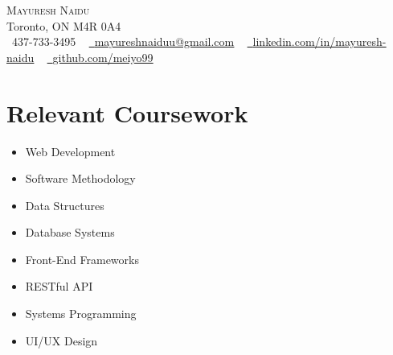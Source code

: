 \documentclass[letterpaper,11pt]{article}
\newcommand{\resumeSubHeadingListStart}{\begin{itemize}[leftmargin=0.0in, label={}]}
\newcommand{\resumeSubHeadingListEnd}{\end{itemize}}
\begin{document}

\begin{center}
    {\Huge \scshape Mayuresh Naidu} \\ \vspace{1pt}
    Toronto, ON M4R 0A4 \\ \vspace{1pt}
    \small \raisebox{-0.1\height}\faPhone\ 437-733-3495 ~ \href{mailto:mayureshnaiduu@gmail.com}{\raisebox{-0.2\height}\faEnvelope\  \underline{mayureshnaiduu@gmail.com}} ~ 
    \href{https://linkedin.com/in/mayuresh-naidu-233802204/}{\raisebox{-0.2\height}\faLinkedin\ \underline{linkedin.com/in/mayuresh-naidu}}  ~
    \href{https://github.com/}{\raisebox{-0.2\height}\faGithub\ \underline{github.com/meiyo99}}
    \vspace{-8pt}
\end{center}


\section{Relevant Coursework}
        \begin{multicols}{4}
            \begin{itemize}[itemsep=-5pt, parsep=3pt]
                \item\small Web Development
                \item Software Methodology
                \item Data Structures
                \item Database Systems
                \item Front-End Frameworks
                \item RESTful API 
                \item Systems Programming
                \item UI/UX Design 
            \end{itemize}
        \end{multicols}
        \vspace*{2.0\multicolsep}
\end{document}
